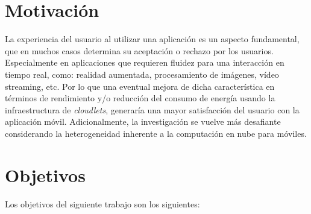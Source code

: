 \begin{comment}
Esto nos dirige a no estar abarrotando el dispositivo móvil con todos los procesos, sino hacer \textit{offloading} de ciertas partes de la 
aplicación siguiendo el paradigma de cliente-servidor, un tomador de decisión decide que parte se ejecutará localmente y que parte de manera 
remota considerando varios parámetros como: ancho de bando de la red inalámbrica, datos a intercambiar, cantidad de procesamiento necesitado para 
completar la tarea, la velocidad del servicio en nube, la velocidad del dispositivo móvil, entre otros. Existen esfuerzos para dar solución 
a este problema, donde podemos nombrar algunos como: MAUI \cite{Cuervo:2010:MMS:1814433.1814441}, CloneCloud \cite{chun2011clonecloud}
and Cuckoo \cite{kemp2012cuckoo}
que mitigaron la limitación de recursos de diferentes formas con resultados muy motivadores.

Existen retos y desafíos en esta área naciente de la MCC, debido al crecimiento competitivo de los compañías proveedoras,
se generó Heterogeneidad entre dispositivos móviles, computación en nube y redes inalámbricas, impidiendo la interoperabilidad y portabilidad,
principalmente.

\end{comment}

\section{Motivación}

La experiencia del usuario al utilizar una aplicación es un aspecto fundamental, que en muchos casos determina su aceptación o rechazo 
por los usuarios. Especialmente en aplicaciones que requieren fluidez para una interacción en tiempo real, como: realidad aumentada,
procesamiento de imágenes, vídeo streaming, etc. Por lo que una eventual mejora de dicha característica en términos de rendimiento y/o 
reducción del consumo de energía usando la infraestructura de \textit{cloudlets}, generaría una mayor satisfacción del usuario con la 
aplicación móvil. Adicionalmente, la investigación se vuelve más desafiante considerando la heterogeneidad inherente 
a la computación en nube para móviles.

\section{Objetivos}

Los objetivos del siguiente trabajo son los siguientes: 

